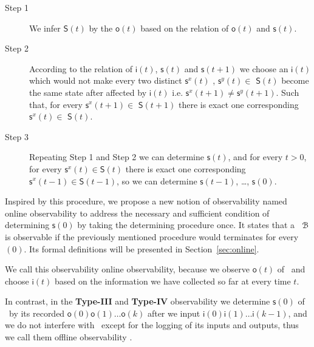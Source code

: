  
\begin{description}
	\item[Step 1] We infer $\mathsf{S}(t)$ by the $\mathsf{o}(t)$ based on the relation of $\mathsf{o}(t)$ and $\mathsf{s}(t)$.
	\item[Step 2] According to the relation of $\mathsf{i}(t)$, $\mathsf{s}(t)$ and $\mathsf{s}(t+1)$ we choose an $\mathsf{i}(t)$ which would not make every two distinct $\mathsf{s}^{x}(t)$ , $\mathsf{s}^{y}(t)$$\in$ $\mathsf{S}(t)$ become the same state after affected by $\mathsf{i}(t)$ i.e. $\mathsf{s}^{x}(t+1)\ne\mathsf{s}^{y}(t+1)$. Such that, for every $\mathsf{s}^{x}(t+1)\in $ $\mathsf{S}(t+1)$ there is exact one corresponding $\mathsf{s}^{x}(t)\in $ $\mathsf{S}(t)$.
	\item[Step 3] Repeating Step 1 and Step 2 we can determine $\mathsf{s}(t)$, and for every $t>0$, for every $\mathsf{s}^{x}(t)\in \mathsf{S}(t)$ there is exact one corresponding $\mathsf{s}^{x}(t-1)\in \mathsf{S}(t-1)$, so we can determine $\mathsf{s}(t-1)$, \ldots, $\mathsf{s}(0)$.
\end{description}



Inspired by this procedure, we propose a new notion of observability named online observability to address the necessary and sufficient condition of determining $\mathsf{s}(0)$ by taking the determining procedure once. It states that a \BCN\ ${\mathcal{B}}$ is observable if the previously mentioned procedure would terminates for every \State$(0)$. Its formal definitions will be presented in Section~\ref{sec:online}. 

We call this observability online observability, because we observe $\mathsf{o}(t)$ of \BCN\ and choose $\mathsf{i}(t)$ based on the information we have collected so far at every time $t$. 

In contrast, in the {\bf Type-III} and {\bf Type-IV} observability we determine $\mathsf{s}(0)$ of \BCN\ by its recorded $\mathsf{o}(0)\mathsf{o}(1)\ldots\mathsf{o}(k)$ after we input $\mathsf{i}(0)\mathsf{i}(1)\ldots\mathsf{i}(k-1)$, and  we do not interfere with \BCN\ except for the logging of its inputs and outputs, thus we call them offline observability \cite{Cassar2017A}. %

